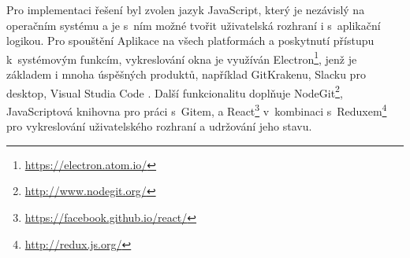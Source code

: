 Pro implementaci řešení byl zvolen jazyk JavaScript, který je nezávislý na operačním systému a je s~ním možné tvořit uživatelská rozhraní i s~aplikační logikou. Pro spouštění Aplikace na všech platformách a poskytnutí přístupu k~systémovým funkcím, vykreslování okna je využíván Electron\footnote{\url{https://electron.atom.io/}}, jenž je základem i mnoha úspěšných produktů, například GitKrakenu, Slacku pro desktop, Visual Studia Code \cite{electron-representative}. Další funkcionalitu doplňuje NodeGit\footnote{\url{http://www.nodegit.org/}}, JavaScriptová knihovna pro práci s~Gitem, a React\footnote{\url{https://facebook.github.io/react/}} v~kombinaci s~Reduxem\footnote{\url{http://redux.js.org/}} pro vykreslování uživatelského rozhraní a udržování jeho stavu.